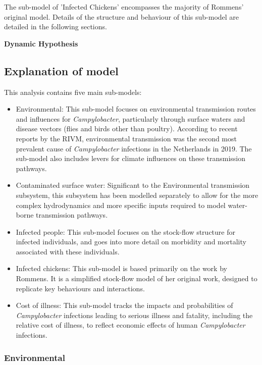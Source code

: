 The sub-model of 'Infected Chickens' encompasses the majority of Rommens' original model. Details of the structure and behaviour of this sub-model are detailed in the following sections. 

\textbf{Dynamic Hypothesis}



   
\subsection{Explanation of model}
   
This analysis contains five main sub-models:
\begin{itemize}
    \item Environmental: This sub-model focuses on environmental transmission routes and influences for \textit{Campylobacter}, particularly through surface waters and disease vectors (flies and birds other than poultry). According to recent reports by the RIVM, environmental transmission was the second most prevalent cause of \textit{Campylobacter} infections in the Netherlands in 2019. The sub-model also includes levers for climate influences on these transmission pathways.
    \item Contaminated surface water: Significant to the Environmental transmission subsystem, this subsystem has been modelled separately to allow for the more complex hydrodynamics and more specific inputs required to model water-borne transmission pathways.
    \item Infected people: This sub-model focuses on the stock-flow structure for infected individuals, and goes into more detail on morbidity and mortality associated with these individuals.
    \item Infected chickens: This sub-model is based primarily on the work by Rommens. It is a simplified stock-flow model of her original work, designed to replicate key behaviours and interactions.
    \item Cost of illness: This sub-model tracks the impacts and probabilities of \textit{Campylobacter} infections leading to serious illness and fatality, including the relative cost of illness, to reflect economic effects of human \textit{Campylobacter} infections.

\end{itemize}

\subsubsection*{Environmental}

